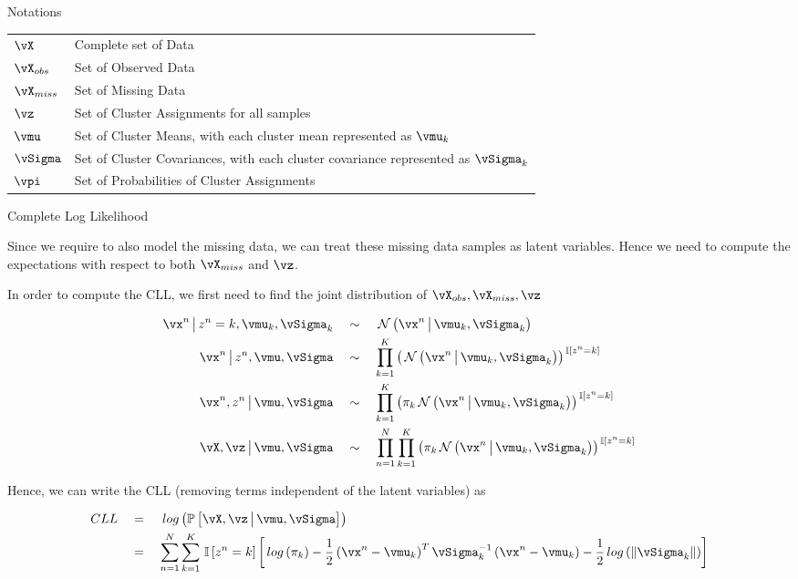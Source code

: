 \documentclass{article}
\begin{document}
\begin{question}
	\begin{qsection}{Notations}

		\begin{tabular}[h!]{p{2cm} l}
			$\vX$			&	Complete set of Data																	\\
			$\vX_{obs}$		&	Set of Observed Data																	\\
			$\vX_{miss}$	&	Set of Missing Data																		\\
			$\vz$			&	Set of Cluster Assignments for all samples												\\
			$\vmu$			&	Set of Cluster Means, with each cluster mean represented as $\vmu_k$					\\
			$\vSigma$		&	Set of Cluster Covariances, with each cluster covariance represented as $\vSigma_k$		\\
			$\vpi$			&	Set of Probabilities of Cluster Assignments 
		\end{tabular}
		
	\end{qsection}

	\begin{qsection}{Complete Log Likelihood}

		Since we require to also model the missing data, we can treat these missing data samples as latent variables. Hence we need to compute the expectations with respect to both $\vX_{miss}$ and $\vz$. \br%

		In order to compute the CLL, we first need to find the joint distribution of $\vX_{obs}, \vX_{miss}, \vz$

		\begin{align*}
			\vx^n \pipe z^n = k, \vmu_k, \vSigma_k	&\qsim	\ND{\vx^n \pipe \vmu_k, \vSigma_k} \\
			\vx^n \pipe z^n, \vmu, \vSigma			&\qsim	\prod_{k = 1}^{K} \para{\ND{\vx^n \pipe \vmu_k, \vSigma_k}}^{\is{z^n = k}} \\
			\vx^n, z^n \pipe \vmu, \vSigma			&\qsim	\prod_{k = 1}^{K} \para{\pi_k \ND{\vx^n \pipe \vmu_k, \vSigma_k}}^{\is{z^n = k}} \\
			\vX, \vz \pipe \vmu, \vSigma			&\qsim	\prod_{n = 1}^{N} \prod_{k = 1}^{K} \para{\pi_k \ND{\vx^n \pipe \vmu_k, \vSigma_k}}^{\is{z^n = k}}
		\end{align*}

		Hence, we can write the CLL (removing terms independent of the latent variables) as

		\begin{align*}
			CLL		&\eq	\log{\prob{\vX, \vz \pipe \vmu, \vSigma}} \\
					&\eq	\sum_{n = 1}^{N} \sum_{k = 1}^{K} \is{z^n = k} \brac{\log{\pi_k} - \frac{1}{2} \para{\vx^n - \vmu_k}^T \vSigma_k^{-1} \para{\vx^n - \vmu_k} - \frac{1}{2} \log{\norm{\vSigma_k}}}
		\end{align*}


\end{qsection}
\end{question}
\end{document}
